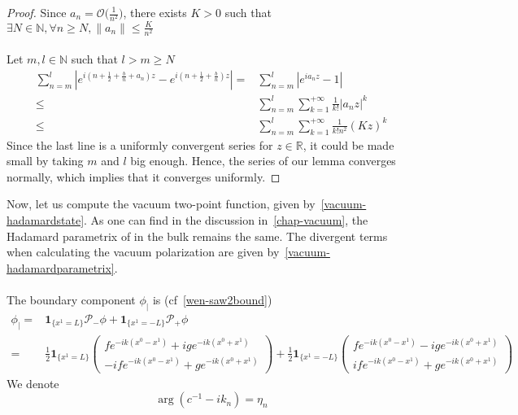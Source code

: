\begin{proof}
Since $a_n = \mathcal{O}\big(\frac{1}{n^2}\big)$, 
there exists $ K > 0$ such that $ \exists N \in\mathbb{N}, \forall n\geq N, \| a_n\| \leq \frac{K}{n^2}$ \\\\
Let $m,l\in\mathbb{N}$ such that $l > m \geq N$
\begin{equation*}
\begin{split}
\sum_{n=m}^{l}  | e^{i(n + \frac 1 2+\frac{b}{n}+a_n)z } - e^{i(n+\frac 1 2+\frac{b}{n})z } | = & 
\sum_{n=m}^{l} | e^{ia_n z} - 1 | \\
%
\leq & \sum_{n=m}^{l}\sum_{k=1}^{+\infty}\frac{1}{k!}| a_n z |^k \\
%
\leq & \sum_{n=m}^l \sum_{k=1}^{+\infty}\frac{1}{k!n^2}(Kz)^k
\end{split}
\end{equation*}
Since the last line is a uniformly convergent series for $z \in \mathbb{R}$, it could be made small by taking $m$ and $l$ big enough.
Hence, the series of our lemma converges normally, which implies that it converges uniformly.
\end{proof}
Now, let us compute the vacuum two-point function, given by~\cref{vacuum-hadamardstate}.
As one can find in the discussion in~\cref{chap-vacuum}, the Hadamard parametrix of in the bulk remains the same. 
The divergent terms when calculating the vacuum polarization are given by~\cref{vacuum-hadamardparametrix}. \\\\
The boundary component $\phi_|$ is (cf~\cref{wen-saw2bound})
\begin{equation*}
\begin{split}
\phi_| = & \mathbf{1}_{\{x^1 = L\}} \mathcal{P}_-\phi + \mathbf{1}_{\{x^1 = -L\}} \mathcal{P}_+\phi \\
%
= & \frac 1 2 \mathbf{1}_{\{x^1 = L\} } \begin{pmatrix} f e^{-ik(x^0 -x^1)} + ig e^{-ik(x^0 + x^1)} \\
-if e^{-ik(x^0 - x^1)} + g e^{-ik(x^0+x^1)}\end{pmatrix}
+ \frac 1 2 \mathbf{1}_{\{x^1 = - L\} } \begin{pmatrix} f e^{-ik(x^0 -x^1)} - ig e^{-ik(x^0 + x^1)} \\
if e^{-ik(x^0 - x^1)} + g e^{-ik(x^0+x^1)}\end{pmatrix} 
\end{split}
\end{equation*}
We denote
\begin{equation*}
\arg(c^{-1} - ik_n) = \eta_n
\end{equation*}
